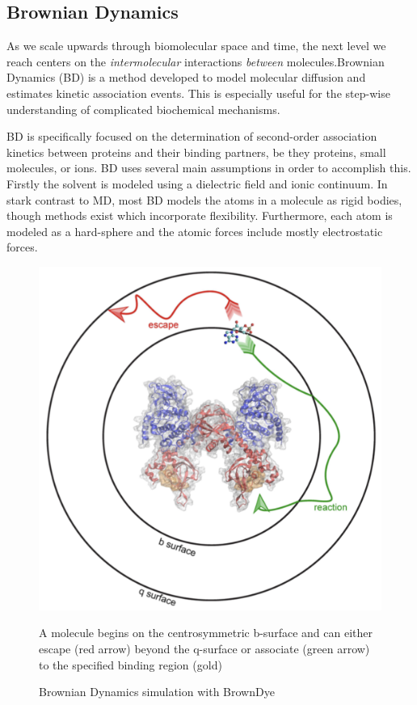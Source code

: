 \documentclass[12pt]{ucsddissertation}
\begin{document}
\begin{dissertationintroduction}
\subsection{Brownian Dynamics}
As we scale upwards through biomolecular space and time, the next level we reach centers on the \textit{intermolecular} interactions \textit{between} molecules.Brownian Dynamics (BD) is a method developed to model molecular diffusion and estimates kinetic association events. This is especially useful for the step-wise understanding of complicated biochemical mechanisms. 

BD is specifically focused on the determination of second-order association kinetics between proteins and their binding partners, be they proteins, small molecules, or ions. BD uses several main assumptions in order to accomplish this. Firstly the solvent is modeled using a dielectric field and ionic continuum. In stark contrast to MD, most BD models the atoms in a molecule as rigid bodies, though methods exist which incorporate flexibility. Furthermore, each atom is modeled as a hard-sphere and the atomic forces include mostly electrostatic forces. 

\setcounter{figure}{3}
\begin{figure}
\centerline{\includegraphics[scale=0.3]{BD.png}}
	\caption{Brownian Dynamics simulation with BrownDye} A molecule begins on the centrosymmetric b-surface and can either escape (red arrow) beyond the q-surface or associate (green arrow) to the specified binding region (gold)
\end{figure}


\end{dissertationintroduction}
\end{document}
